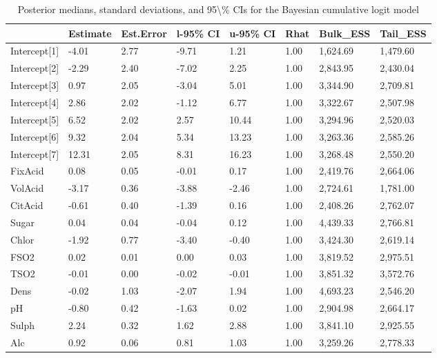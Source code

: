 \documentclass[
  doc,floatsintext]{apa6}
\begin{document}
\begin{table}[H]

\begin{center}
\begin{threeparttable}

\caption{\label{tab:bayes-summary}Posterior medians, standard deviations, and 95\textbackslash{}\% CIs for the Bayesian cumulative logit model}

\begin{tabular}{llllllll}
\toprule
 & \multicolumn{1}{c}{Estimate} & \multicolumn{1}{c}{Est.Error} & \multicolumn{1}{c}{l-95\% CI} & \multicolumn{1}{c}{u-95\% CI} & \multicolumn{1}{c}{Rhat} & \multicolumn{1}{c}{Bulk\_ESS} & \multicolumn{1}{c}{Tail\_ESS}\\
\midrule
Intercept[1] & -4.01 & 2.77 & -9.71 & 1.21 & 1.00 & 1,624.69 & 1,479.60\\
Intercept[2] & -2.29 & 2.40 & -7.02 & 2.25 & 1.00 & 2,843.95 & 2,430.04\\
Intercept[3] & 0.97 & 2.05 & -3.04 & 5.01 & 1.00 & 3,344.90 & 2,709.81\\
Intercept[4] & 2.86 & 2.02 & -1.12 & 6.77 & 1.00 & 3,322.67 & 2,507.98\\
Intercept[5] & 6.52 & 2.02 & 2.57 & 10.44 & 1.00 & 3,294.96 & 2,520.03\\
Intercept[6] & 9.32 & 2.04 & 5.34 & 13.23 & 1.00 & 3,263.36 & 2,585.26\\
Intercept[7] & 12.31 & 2.05 & 8.31 & 16.23 & 1.00 & 3,268.48 & 2,550.20\\
FixAcid & 0.08 & 0.05 & -0.01 & 0.17 & 1.00 & 2,419.76 & 2,664.06\\
VolAcid & -3.17 & 0.36 & -3.88 & -2.46 & 1.00 & 2,724.61 & 1,781.00\\
CitAcid & -0.61 & 0.40 & -1.39 & 0.16 & 1.00 & 2,408.26 & 2,762.07\\
Sugar & 0.04 & 0.04 & -0.04 & 0.12 & 1.00 & 4,439.33 & 2,766.81\\
Chlor & -1.92 & 0.77 & -3.40 & -0.40 & 1.00 & 3,424.30 & 2,619.14\\
FSO2 & 0.02 & 0.01 & 0.00 & 0.03 & 1.00 & 3,819.52 & 2,975.51\\
TSO2 & -0.01 & 0.00 & -0.02 & -0.01 & 1.00 & 3,851.32 & 3,572.76\\
Dens & -0.02 & 1.03 & -2.07 & 1.94 & 1.00 & 4,693.23 & 2,546.20\\
pH & -0.80 & 0.42 & -1.63 & 0.02 & 1.00 & 2,904.98 & 2,664.17\\
Sulph & 2.24 & 0.32 & 1.62 & 2.88 & 1.00 & 3,841.10 & 2,925.55\\
Alc & 0.92 & 0.06 & 0.81 & 1.03 & 1.00 & 3,259.26 & 2,778.33\\
\bottomrule
\end{tabular}

\end{threeparttable}
\end{center}

\end{table}
\end{document}
